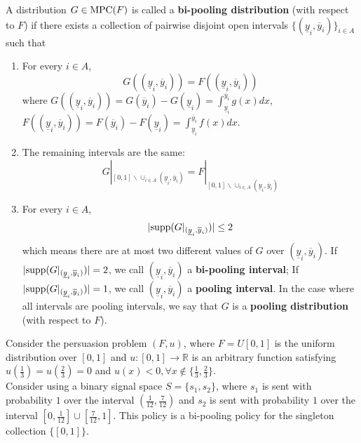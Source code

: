 \documentclass[11pt]{elegantbook}
\begin{document}
\begin{definition}
    \normalfont
    A distribution $G \in \textnormal{MPC}(F)$ is called a \textbf{bi-pooling distribution} (with respect to $F$) if there exists a collection of pairwise disjoint open intervals $\{(\underline{y}_i,\overline{y}_i)\}_{i\in A}$ such that
    \begin{enumerate}[$\circ$]
        \item For every $i\in A$, $$G((\underline{y}_i,\overline{y}_i))=F((\underline{y}_i,\overline{y}_i))$$
        where $G((\underline{y}_i,\overline{y}_i))=G(\overline{y}_i)-G(\underline{y}_i)=\int_{\underline{y}_i}^{\overline{y}_i}g(x)dx$, $F((\underline{y}_i,\overline{y}_i))=F(\overline{y}_i)-F(\underline{y}_i)=\int_{\underline{y}_i}^{\overline{y}_i}f(x)dx$.
        \item The remaining intervals are the same: $$G|_{[0,1]\backslash \cup_{i\in A}(\underline{y}_i,\overline{y}_i)}=F|_{[0,1]\backslash \cup_{i\in A}(\underline{y}_i,\overline{y}_i)}$$
        \item For every $i\in A$, $$|\textnormal{supp}(G|_{(\underline{y}_i,\overline{y}_i)})|\leq 2$$
        which means there are at most two different values of $G$ over $(\underline{y}_i,\overline{y}_i)$. If $|\textnormal{supp}(G|_{(\underline{y}_i,\overline{y}_i)})|=2$, we call $(\underline{y}_i,\overline{y}_i)$ a \textbf{bi-pooling interval}; If $|\textnormal{supp}(G|_{(\underline{y}_i,\overline{y}_i)})|=1$, we call $(\underline{y}_i,\overline{y}_i)$ a \textbf{pooling interval}. In the case where all intervals are pooling intervals, we say that $G$ is a \textbf{pooling distribution} (with respect to $F$).
    \end{enumerate}
\end{definition}
\begin{example}
    Consider the persuasion problem $(F, u)$, where $F = U [0, 1]$ is the uniform
    distribution over $[0, 1]$ and $u:[0,1] \rightarrow \mathbb{R}$ is an arbitrary function satisfying $u(\frac{1}{3})=u(\frac{2}{3})=0$ and $u(x)<0,\forall x\notin \{\frac{1}{3},\frac{2}{3}\}$.\\Consider using a binary signal space $S=\{s_1,s_2\}$, where $s_1$ is sent with probability $1$ over the interval $(\frac{1}{12},\frac{7}{12})$ and $s_2$ is sent with probability $1$ over the interval $[0,\frac{1}{12}]\cup[\frac{7}{12},1]$. This policy is a bi-pooling policy for the singleton collection $\{[0,1]\}$.
\end{example}
\end{document}
